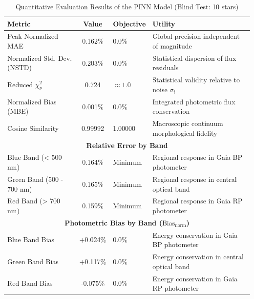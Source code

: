 
\begin{table}[htpb]
\centering
\caption{Quantitative Evaluation Results of the PINN Model (Blind Test: 10 stars)}
\label{tab:pinn_evaluation}
\begin{tabular}{lcll}
\hline
\textbf{Metric} & \textbf{Value} & \textbf{Objective} & \textbf{Utility} \\
\hline
Peak-Normalized MAE & 0.162\% & 0.0\% & Global precision independent of magnitude \\
Normalized Std. Dev. (NSTD) & 0.203\% & 0.0\% & Statistical dispersion of flux residuals \\
Reduced $\chi^2_\nu$ & 0.724 & $\approx 1.0$ & Statistical validity relative to noise $\sigma_i$ \\
Normalized Bias (MBE) & 0.001\% & 0.0\% & Integrated photometric flux conservation \\
Cosine Similarity & 0.99992 & 1.00000 & Macroscopic continuum morphological fidelity \\
\hline
\multicolumn{4}{c}{\textbf{Relative Error by Band}} \\
\hline
Blue Band (< 500 nm) & 0.164\% & Minimum & Regional response in Gaia BP photometer \\
Green Band (500 - 700 nm) & 0.165\% & Minimum & Regional response in central optical band \\
Red Band (> 700 nm) & 0.159\% & Minimum & Regional response in Gaia RP photometer \\
\hline
\multicolumn{4}{c}{\textbf{Photometric Bias by Band ($\text{Bias}_{\text{norm}}$)}} \\
\hline
Blue Band Bias & +0.024\% & 0.0\% & Energy conservation in Gaia BP photometer \\
Green Band Bias & +0.117\% & 0.0\% & Energy conservation in central optical band \\
Red Band Bias & -0.075\% & 0.0\% & Energy conservation in Gaia RP photometer \\
\hline
\end{tabular}
\end{table}
